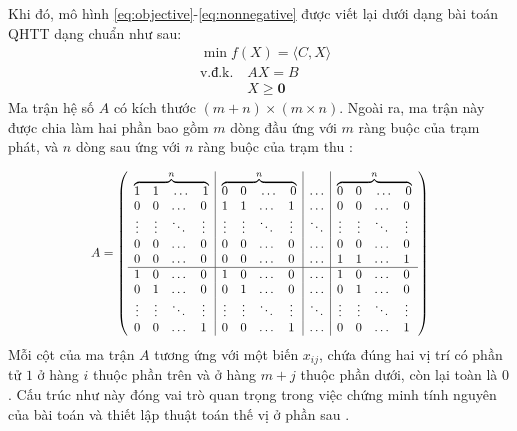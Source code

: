 \documentclass[../main.tex]{subfiles}
\begin{document}
Khi đó, mô hình \eqref{eq:objective}-\eqref{eq:nonnegative} được viết lại dưới dạng bài toán QHTT dạng chuẩn như sau:
\begin{align*}
    & \min f(X) = \langle C, X \rangle \\
    & \text{v.đ.k.} \quad AX = B \\
    & \phantom{\text{v.đ.k.}} \quad X \ge \mathbf{0}
\end{align*}
Ma trận hệ số $A$ có kích thước $(m+n) \times (m \times n)$. Ngoài ra, ma trận này được chia làm hai phần bao gồm $m$ dòng đầu ứng với $m$ ràng buộc của trạm phát, và $n$ dòng sau ứng với $n$ ràng buộc của trạm thu \cite{bachkim}:

\begin{equation} \label{eq:matrix_A}
\resizebox{0.7\textwidth}{!}{$
A = \left(
\begin{array}{cccc|cccc|c|cccc}
\multicolumn{4}{c|}{\overbrace{1 \quad 1 \quad \dots \quad 1}^{n}} & 
\multicolumn{4}{c|}{\overbrace{0 \quad 0 \quad \dots \quad 0}^{n}} & 
\dots & 
\multicolumn{4}{c}{\overbrace{0 \quad 0 \quad \dots \quad 0}^{n}} \\
0 & 0 & \dots & 0 & 1 & 1 & \dots & 1 & \dots & 0 & 0 & \dots & 0 \\
\vdots & \vdots & \ddots & \vdots & \vdots & \vdots & \ddots & \vdots & \ddots & \vdots & \vdots & \ddots & \vdots \\
0 & 0 & \dots & 0 & 0 & 0 & \dots & 0 & \dots & 0 & 0 & \dots & 0 \\
0 & 0 & \dots & 0 & 0 & 0 & \dots & 0 & \dots & 1 & 1 & \dots & 1 \\
\hline
1 & 0 & \dots & 0 & 1 & 0 & \dots & 0 & \dots & 1 & 0 & \dots & 0 \\
0 & 1 & \dots & 0 & 0 & 1 & \dots & 0 & \dots & 0 & 1 & \dots & 0 \\
\vdots & \vdots & \ddots & \vdots & \vdots & \vdots & \ddots & \vdots & \ddots & \vdots & \vdots & \ddots & \vdots \\
0 & 0 & \dots & 1 & 0 & 0 & \dots & 1 & \dots & 0 & 0 & \dots & 1
\end{array}
\right)
$}
\end{equation}
Mỗi cột của ma trận $A$ tương ứng với một biến $x_{ij}$, chứa đúng hai vị trí có phần tử $1$ ở hàng $i$ thuộc phần trên và ở hàng $m+j$ thuộc phần dưới, còn lại toàn là $0$. Cấu trúc như này đóng vai trò quan trọng trong việc chứng minh tính nguyên của bài toán và thiết lập thuật toán thế vị ở phần sau \cite{dantzig1951}.
\end{document}
